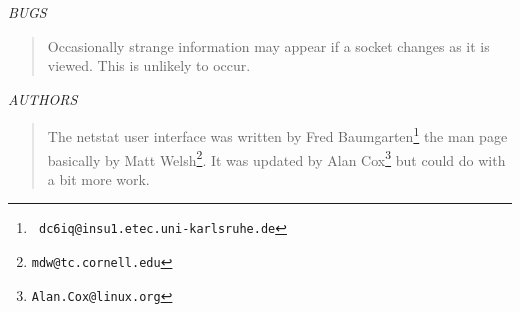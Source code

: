 \begin{appendix}
\begin{english}
{\sl BUGS}
\begin{quote}
	Occasionally strange information may appear if a socket changes
	as it is viewed. This is unlikely to occur.
\end{quote}

{\sl AUTHORS}
\begin{quote}
	The netstat user interface was written by Fred Baumgarten\footnote{{\tt
	dc6iq@insu1.etec.uni-karlsruhe.de}} the man page basically by Matt
	Welsh\footnote{{\tt mdw@tc.cornell.edu}}. It was updated by Alan
	Cox\footnote{{\tt Alan.Cox@linux.org}} but could do with a bit more
	work.
\end{quote}
\end{english}

%
%
\end{appendix}